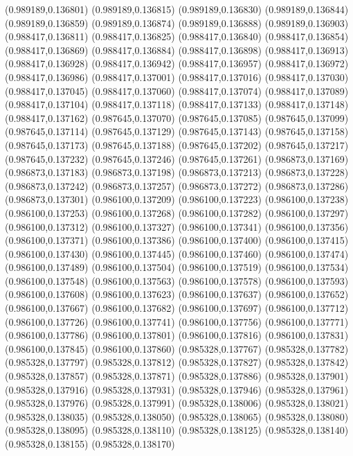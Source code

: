 (0.989189,0.136801)
(0.989189,0.136815)
(0.989189,0.136830)
(0.989189,0.136844)
(0.989189,0.136859)
(0.989189,0.136874)
(0.989189,0.136888)
(0.989189,0.136903)
(0.988417,0.136811)
(0.988417,0.136825)
(0.988417,0.136840)
(0.988417,0.136854)
(0.988417,0.136869)
(0.988417,0.136884)
(0.988417,0.136898)
(0.988417,0.136913)
(0.988417,0.136928)
(0.988417,0.136942)
(0.988417,0.136957)
(0.988417,0.136972)
(0.988417,0.136986)
(0.988417,0.137001)
(0.988417,0.137016)
(0.988417,0.137030)
(0.988417,0.137045)
(0.988417,0.137060)
(0.988417,0.137074)
(0.988417,0.137089)
(0.988417,0.137104)
(0.988417,0.137118)
(0.988417,0.137133)
(0.988417,0.137148)
(0.988417,0.137162)
(0.987645,0.137070)
(0.987645,0.137085)
(0.987645,0.137099)
(0.987645,0.137114)
(0.987645,0.137129)
(0.987645,0.137143)
(0.987645,0.137158)
(0.987645,0.137173)
(0.987645,0.137188)
(0.987645,0.137202)
(0.987645,0.137217)
(0.987645,0.137232)
(0.987645,0.137246)
(0.987645,0.137261)
(0.986873,0.137169)
(0.986873,0.137183)
(0.986873,0.137198)
(0.986873,0.137213)
(0.986873,0.137228)
(0.986873,0.137242)
(0.986873,0.137257)
(0.986873,0.137272)
(0.986873,0.137286)
(0.986873,0.137301)
(0.986100,0.137209)
(0.986100,0.137223)
(0.986100,0.137238)
(0.986100,0.137253)
(0.986100,0.137268)
(0.986100,0.137282)
(0.986100,0.137297)
(0.986100,0.137312)
(0.986100,0.137327)
(0.986100,0.137341)
(0.986100,0.137356)
(0.986100,0.137371)
(0.986100,0.137386)
(0.986100,0.137400)
(0.986100,0.137415)
(0.986100,0.137430)
(0.986100,0.137445)
(0.986100,0.137460)
(0.986100,0.137474)
(0.986100,0.137489)
(0.986100,0.137504)
(0.986100,0.137519)
(0.986100,0.137534)
(0.986100,0.137548)
(0.986100,0.137563)
(0.986100,0.137578)
(0.986100,0.137593)
(0.986100,0.137608)
(0.986100,0.137623)
(0.986100,0.137637)
(0.986100,0.137652)
(0.986100,0.137667)
(0.986100,0.137682)
(0.986100,0.137697)
(0.986100,0.137712)
(0.986100,0.137726)
(0.986100,0.137741)
(0.986100,0.137756)
(0.986100,0.137771)
(0.986100,0.137786)
(0.986100,0.137801)
(0.986100,0.137816)
(0.986100,0.137831)
(0.986100,0.137845)
(0.986100,0.137860)
(0.985328,0.137767)
(0.985328,0.137782)
(0.985328,0.137797)
(0.985328,0.137812)
(0.985328,0.137827)
(0.985328,0.137842)
(0.985328,0.137857)
(0.985328,0.137871)
(0.985328,0.137886)
(0.985328,0.137901)
(0.985328,0.137916)
(0.985328,0.137931)
(0.985328,0.137946)
(0.985328,0.137961)
(0.985328,0.137976)
(0.985328,0.137991)
(0.985328,0.138006)
(0.985328,0.138021)
(0.985328,0.138035)
(0.985328,0.138050)
(0.985328,0.138065)
(0.985328,0.138080)
(0.985328,0.138095)
(0.985328,0.138110)
(0.985328,0.138125)
(0.985328,0.138140)
(0.985328,0.138155)
(0.985328,0.138170)

